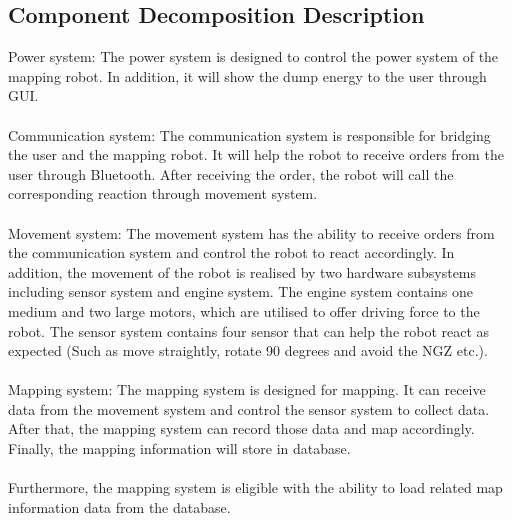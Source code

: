 \documentclass[11pt, a4paper]{article}
\begin{document}
\subsection{Component Decomposition Description}
Power system: The power system is designed to control the power system of the mapping robot. In addition, it will show the dump energy to the user through GUI.\\
\\
Communication system: The communication system is responsible for bridging the user and the mapping robot. It will help the robot to receive orders from the user through Bluetooth. After receiving the order, the robot will call the corresponding reaction through movement system. \\
\\
Movement system: The movement system has the ability to receive orders from the communication system and control the robot to react accordingly. In addition, the movement of the robot is realised by two hardware subsystems including sensor system and engine system. The engine system contains one medium and two large motors, which are utilised to offer driving force to the robot. The sensor system contains four sensor that can help the robot react as expected (Such as move straightly, rotate 90 degrees and avoid the NGZ etc.).  \\
\\
Mapping system: The mapping system is designed for mapping. It can receive data from the movement system and control the sensor system to collect data. After that, the mapping system can record those data and map accordingly. Finally, the mapping information will store in database.\\
\\
Furthermore, the mapping system is eligible with the ability to load related map information data from the database.\\
\end{document}

